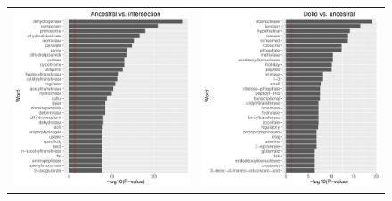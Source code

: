 \documentclass[12pt,letterpaper]{article}
\begin{document}
\begin{figure}
\centering
\begin{tabular}{c c}
\includegraphics[scale=0.4]{ancestral-intersection-pval.pdf}&
\includegraphics[scale=0.4]{dollo-ancestral-pval.pdf}\\

\end{tabular}
\end{figure}
\end{document}
